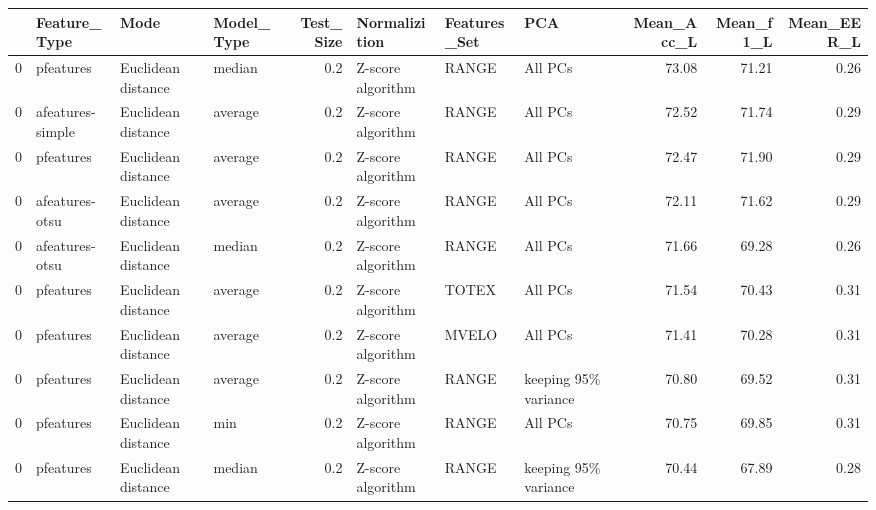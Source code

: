 \begin{tabular}{llllrlllrrr}
\toprule
{} &      Feature\_Type &                Mode & Model\_Type &  Test\_Size &      Normalizition & Features\_Set &                   PCA &  Mean\_Acc\_L &  Mean\_f1\_L &  Mean\_EER\_L \\
\midrule
0 &         pfeatures &  Euclidean distance &     median &        0.2 &  Z-score algorithm &        RANGE &               All PCs &       73.08 &      71.21 &        0.26 \\
0 &  afeatures-simple &  Euclidean distance &    average &        0.2 &  Z-score algorithm &        RANGE &               All PCs &       72.52 &      71.74 &        0.29 \\
0 &         pfeatures &  Euclidean distance &    average &        0.2 &  Z-score algorithm &        RANGE &               All PCs &       72.47 &      71.90 &        0.29 \\
0 &    afeatures-otsu &  Euclidean distance &    average &        0.2 &  Z-score algorithm &        RANGE &               All PCs &       72.11 &      71.62 &        0.29 \\
0 &    afeatures-otsu &  Euclidean distance &     median &        0.2 &  Z-score algorithm &        RANGE &               All PCs &       71.66 &      69.28 &        0.26 \\
0 &         pfeatures &  Euclidean distance &    average &        0.2 &  Z-score algorithm &        TOTEX &               All PCs &       71.54 &      70.43 &        0.31 \\
0 &         pfeatures &  Euclidean distance &    average &        0.2 &  Z-score algorithm &        MVELO &               All PCs &       71.41 &      70.28 &        0.31 \\
0 &         pfeatures &  Euclidean distance &    average &        0.2 &  Z-score algorithm &        RANGE &  keeping 95\% variance &       70.80 &      69.52 &        0.31 \\
0 &         pfeatures &  Euclidean distance &        min &        0.2 &  Z-score algorithm &        RANGE &               All PCs &       70.75 &      69.85 &        0.31 \\
0 &         pfeatures &  Euclidean distance &     median &        0.2 &  Z-score algorithm &        RANGE &  keeping 95\% variance &       70.44 &      67.89 &        0.28 \\
\bottomrule
\end{tabular}
